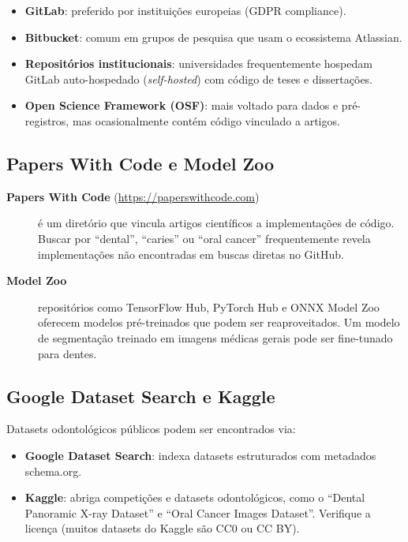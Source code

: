 \begin{itemize}
  \item \textbf{GitLab}: preferido por instituições europeias (GDPR compliance).
  \item \textbf{Bitbucket}: comum em grupos de pesquisa que usam o ecossistema Atlassian.
  \item \textbf{Repositórios institucionais}: universidades frequentemente hospedam
    GitLab auto-hospedado (\textit{self-hosted}) com código de teses e dissertações.
  \item \textbf{Open Science Framework (OSF)}: mais voltado para dados e pré-registros,
    mas ocasionalmente contém código vinculado a artigos.
\end{itemize}

\subsection{Papers With Code e Model Zoo}

\begin{description}
  \item[\textbf{Papers With Code} (\url{https://paperswithcode.com})] é um
    diretório que vincula artigos científicos a implementações de código.
    Buscar por ``dental'', ``caries'' ou ``oral cancer'' frequentemente
    revela implementações não encontradas em buscas diretas no GitHub.

  \item[\textbf{Model Zoo}] repositórios como TensorFlow Hub, PyTorch Hub e
    ONNX Model Zoo oferecem modelos pré-treinados que podem ser
    reaproveitados. Um modelo de segmentação treinado em imagens médicas
    gerais pode ser fine-tunado para dentes.
\end{description}

\subsection{Google Dataset Search e Kaggle}

Datasets odontológicos públicos podem ser encontrados via:

\begin{itemize}
  \item \textbf{Google Dataset Search}: indexa datasets estruturados com
    metadados schema.org.
  \item \textbf{Kaggle}: abriga competições e datasets odontológicos, como
    o ``Dental Panoramic X-ray Dataset'' e ``Oral Cancer Images Dataset''.
    Verifique a licença (muitos datasets do Kaggle são CC0 ou CC BY).
\end{itemize}

